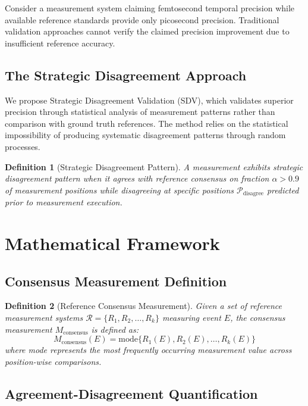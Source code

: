 \documentclass[12pt,a4paper]{article}
\newtheorem{definition}{Definition}
\begin{document}
Consider a measurement system claiming femtosecond temporal precision while available reference standards provide only picosecond precision. Traditional validation approaches cannot verify the claimed precision improvement due to insufficient reference accuracy.

\subsection{The Strategic Disagreement Approach}

We propose Strategic Disagreement Validation (SDV), which validates superior precision through statistical analysis of measurement patterns rather than comparison with ground truth references. The method relies on the statistical impossibility of producing systematic disagreement patterns through random processes.

\begin{definition}[Strategic Disagreement Pattern]
A measurement exhibits strategic disagreement pattern when it agrees with reference consensus on fraction $\alpha > 0.9$ of measurement positions while disagreeing at specific positions $\mathcal{P}_{\text{disagree}}$ predicted prior to measurement execution.
\end{definition}

\section{Mathematical Framework}

\subsection{Consensus Measurement Definition}

\begin{definition}[Reference Consensus Measurement]
Given a set of reference measurement systems $\mathcal{R} = \{R_1, R_2, \ldots, R_k\}$ measuring event $E$, the consensus measurement $M_{\text{consensus}}$ is defined as:
\begin{equation}
M_{\text{consensus}}(E) = \text{mode}\{R_1(E), R_2(E), \ldots, R_k(E)\}
\end{equation}
where mode represents the most frequently occurring measurement value across position-wise comparisons.
\end{definition}

\subsection{Agreement-Disagreement Quantification}
\end{document}
